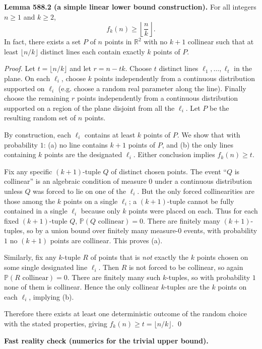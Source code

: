 \bigskip
\noindent\textbf{Lemma 588.2 (a simple linear lower bound construction).}
For all integers $n\ge 1$ and $k\ge 2$,
\[
 f_k(n)\ge \left\lfloor\frac nk\right\rfloor.
\]
In fact, there exists a set $P$ of $n$ points in $\mathbb{R}^2$ with no $k+1$ collinear such that at least $\lfloor n/k\rfloor$ distinct lines each contain exactly $k$ points of $P$.

\noindent\emph{Proof.}
Let $t=\lfloor n/k\rfloor$ and let $r=n-tk$.
Choose $t$ distinct lines $\ell_1,\dots,\ell_t$ in the plane.
On each $\ell_i$, choose $k$ points independently from a continuous distribution supported on $\ell_i$ (e.g. choose a random real parameter along the line).
Finally choose the remaining $r$ points independently from a continuous distribution supported on a region of the plane disjoint from all the $\ell_i$.
Let $P$ be the resulting random set of $n$ points.

By construction, each $\ell_i$ contains at least $k$ points of $P$.
We show that with probability $1$:
(a) no line contains $k+1$ points of $P$, and
(b) the only lines containing $k$ points are the designated $\ell_i$.
Either conclusion implies $f_k(n)\ge t$.

Fix any specific $(k+1)$-tuple $Q$ of distinct chosen points.
The event ``$Q$ is collinear'' is an algebraic condition of measure $0$ under a continuous distribution unless $Q$ was forced to lie on one of the $\ell_i$.
But the only forced collinearities are those among the $k$ points on a single $\ell_i$; a $(k+1)$-tuple cannot be fully contained in a single $\ell_i$ because only $k$ points were placed on each.
Thus for each fixed $(k+1)$-tuple $Q$, $\mathbb{P}(Q\text{ collinear})=0$.
There are finitely many $(k+1)$-tuples, so by a union bound over finitely many measure-$0$ events, with probability $1$ no $(k+1)$ points are collinear.
This proves (a).

Similarly, fix any $k$-tuple $R$ of points that is \emph{not} exactly the $k$ points chosen on some single designated line $\ell_i$.
Then $R$ is not forced to be collinear, so again $\mathbb{P}(R\text{ collinear})=0$.
There are finitely many such $k$-tuples, so with probability $1$ none of them is collinear.
Hence the only collinear $k$-tuples are the $k$ points on each $\ell_i$, implying (b).

Therefore there exists at least one deterministic outcome of the random choice with the stated properties, giving $f_k(n)\ge t=\lfloor n/k\rfloor$.
\qed

\bigskip
\noindent\textbf{Fast reality check (numerics for the trivial upper bound).}

